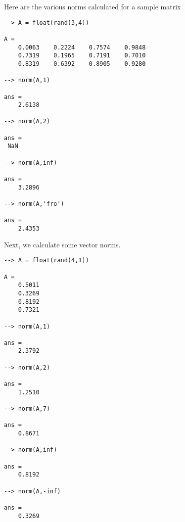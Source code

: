 Here are the various norms calculated for a sample matrix
\begin{verbatim}
--> A = float(rand(3,4))

A = 
    0.0063    0.2224    0.7574    0.9848 
    0.7319    0.1965    0.7191    0.7010 
    0.8319    0.6392    0.8905    0.9280 

--> norm(A,1)

ans = 
    2.6138 

--> norm(A,2)

ans = 
 NaN 

--> norm(A,inf)

ans = 
    3.2896 

--> norm(A,'fro')

ans = 
    2.4353 
\end{verbatim}
Next, we calculate some vector norms.
\begin{verbatim}
--> A = float(rand(4,1))

A = 
    0.5011 
    0.3269 
    0.8192 
    0.7321 

--> norm(A,1)

ans = 
    2.3792 

--> norm(A,2)

ans = 
    1.2510 

--> norm(A,7)

ans = 
    0.8671 

--> norm(A,inf)

ans = 
    0.8192 

--> norm(A,-inf)

ans = 
    0.3269 
\end{verbatim}
